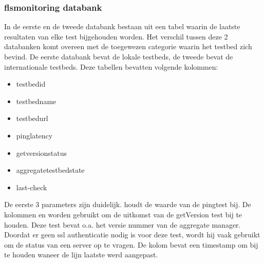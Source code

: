 \subsubsection{flsmonitoring databank}
\npar
In de eerste en de tweede databank bestaan uit een tabel waarin de laatste resultaten van elke test bijgehouden worden. Het verschil tussen deze 2 databanken komt overeen met de toegewezen categorie waarin het testbed zich bevind. De eerste databank bevat de lokale testbeds, de tweede bevat de internationale testbeds. Deze tabellen bevatten volgende kolommen:
\begin{itemize}
\item testbedid
\item testbedname
\item testbedurl
\item pinglatency
\item getversionstatus
\item aggregatetestbedstate
\item last-check
\end{itemize}
 De eerste 3 parameters zijn duidelijk.  houdt de waarde van de pingtest bij.
De kolommen  en  worden gebruikt om de uitkomst van de getVersion test bij te houden. Deze test bevat o.a. het versie nummer van de aggregate manager. Doordat er geen ssl authenticatie nodig is voor deze test, wordt hij vaak gebruikt om de status van een server op te vragen. De kolom  bevat een timestamp om bij te houden waneer de lijn laatste werd aangepast.
